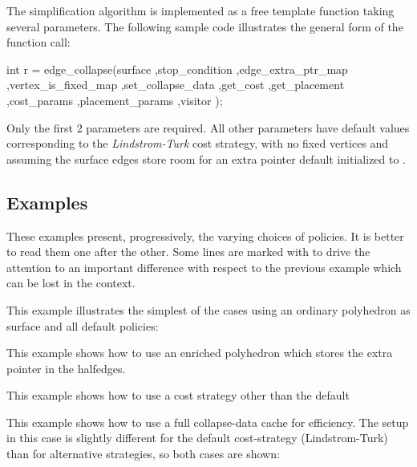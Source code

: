 The simplification algorithm is implemented as a free template function taking several parameters. The following sample code illustrates the general form of the function call:

\begin{cprog}
int r = edge_collapse(surface
                     ,stop_condition
                     ,edge_extra_ptr_map
                     ,vertex_is_fixed_map
                     ,set_collapse_data
                     ,get_cost
                     ,get_placement
                     ,cost_params
                     ,placement_params
                     ,visitor 
                     );
\end{cprog}

Only the first 2 parameters are required. All other parameters have default values corresponding to the {\em Lindstrom-Turk} cost strategy, with no fixed vertices and assuming the surface edges store room for an extra pointer default initialized to .

\subsection{Examples}

These examples present, progressively, the varying choices of policies. It is better to read them one after the other.
Some lines are marked with  to drive the attention to an important difference with respect to the previous example which can be lost in the context.

This example illustrates the simplest of the cases using an ordinary polyhedron as surface and all default policies:

This example shows how to use an enriched polyhedron which stores the extra pointer in the halfedges.

This example shows how to use a cost strategy other than the default

This example shows how to use a full collapse-data cache for efficiency. The setup in this case is slightly different for the default cost-strategy (Lindstrom-Turk) than for alternative strategies, so both cases are shown:

